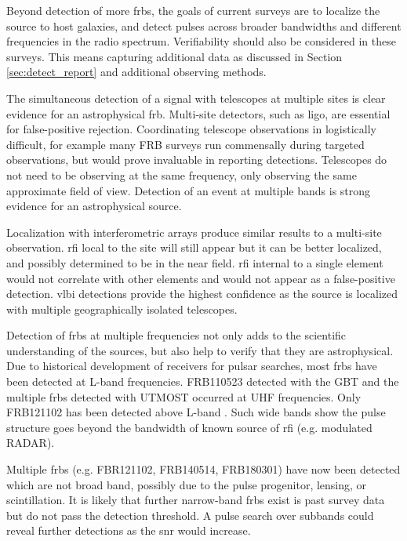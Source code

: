\documentclass[a4paper,fleqn,usenatbib]{mnras}
\begin{document}
Beyond detection of more \glspl{frb}, the goals of current surveys are to
localize the source to host galaxies, and detect pulses across broader
bandwidths and different frequencies in the radio spectrum. Verifiability should
also be considered in these surveys. This means capturing additional data as
discussed in Section \ref{sec:detect_report} and additional observing methods.

The simultaneous detection of a signal with telescopes at multiple sites is
clear evidence for an astrophysical \gls{frb}.  Multi-site detectors, such as 
\gls{ligo}, are essential for false-positive rejection. Coordinating telescope
observations in logistically difficult, for example many FRB surveys run
commensally during targeted observations, but would prove invaluable in
reporting detections. Telescopes do not need to be observing at the same
frequency, only observing the same approximate field of view. Detection of an
event at multiple bands is strong evidence for an astrophysical source.

Localization with interferometric arrays produce similar results to a multi-site
observation. \gls{rfi} local to the site will still appear but it can be better
localized, and possibly determined to be in the near field. \gls{rfi} internal
to a single element would not correlate with other elements and would not appear
as a false-positive detection.  \gls{vlbi} detections provide the highest
confidence as the source is localized with multiple geographically isolated
telescopes.

Detection of \glspl{frb} at multiple frequencies not only adds to the scientific
understanding of the sources, but also help to verify that they are
astrophysical.  Due to historical development of receivers for pulsar searches,
most \glspl{frb} have been detected at L-band frequencies. FRB110523
detected with the GBT and the multiple \glspl{frb} detected with UTMOST occurred
at UHF frequencies.  Only FRB121102 has been detected above L-band
\citep{atel10675}.  Such wide bands show the pulse structure goes beyond the
bandwidth of known source of \gls{rfi} (e.g. modulated RADAR). 

Multiple \glspl{frb} (e.g. FBR121102, FRB140514, FRB180301) have now been
detected which are not broad band, possibly due to the pulse progenitor,
lensing, or scintillation. It is likely that further narrow-band \glspl{frb}
exist is past survey data but do not pass the detection threshold. A pulse
search over subbands could reveal further detections as the \gls{snr} would
increase.
\end{document}
